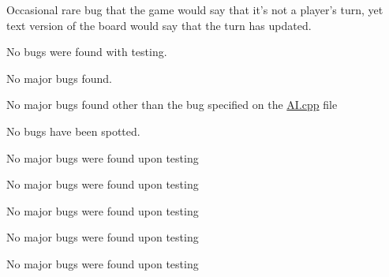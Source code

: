 
\begin{DoxyRefList}
\item[\label{bug__bug000001}%
\hypertarget{bug__bug000001}{}%
File \hyperlink{ai_8cpp}{ai.cpp} ]Occasional rare bug that the game would say that it's not a player's turn, yet text version of the board would say that the turn has updated. 
\item[\label{bug__bug000002}%
\hypertarget{bug__bug000002}{}%
File \hyperlink{board_8cpp}{board.cpp} ]No bugs were found with testing.  
\item[\label{bug__bug000003}%
\hypertarget{bug__bug000003}{}%
File \hyperlink{board_8h}{board.h} ]No major bugs found. 
\item[\label{bug__bug000004}%
\hypertarget{bug__bug000004}{}%
File \hyperlink{game_8cpp}{game.cpp} ]No major bugs found other than the bug specified on the \hyperlink{ai_8cpp}{A\-I.\-cpp} file  
\item[\label{bug__bug000005}%
\hypertarget{bug__bug000005}{}%
File \hyperlink{game_8h}{game.h} ]No bugs have been spotted. 
\item[\label{bug__bug000006}%
\hypertarget{bug__bug000006}{}%
File \hyperlink{main_8cpp}{main.cpp} ]No major bugs were found upon testing  
\item[\label{bug__bug000007}%
\hypertarget{bug__bug000007}{}%
File \hyperlink{mainwindow_8cpp}{mainwindow.cpp} ]No major bugs were found upon testing 
\item[\label{bug__bug000008}%
\hypertarget{bug__bug000008}{}%
File \hyperlink{mainwindow_8h}{mainwindow.h} ]No major bugs were found upon testing 
\item[\label{bug__bug000009}%
\hypertarget{bug__bug000009}{}%
File \hyperlink{tile_8cpp}{tile.cpp} ]No major bugs were found upon testing 
\item[\label{bug__bug000010}%
\hypertarget{bug__bug000010}{}%
File \hyperlink{tile_8h}{tile.h} ]No major bugs were found upon testing
\end{DoxyRefList}